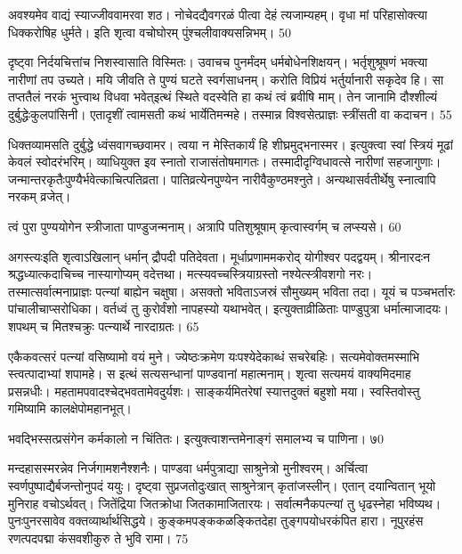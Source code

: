 अवश्यमेव वाद्यं स्याज्जीववामरवा शठ।
 नोचेदद्यैवगरळं पीत्वा देहं त्यजाम्यहम्।
 वृधा मां परिहासोक्त्या धिक्करोषिह धुर्मते।
 इति शृत्वा वचोघोरम् पुंश्चलीवाक्यसन्निभम्।
 50

  दृष्ट्वा निर्दयचित्तांच निशस्वासाति विस्मितः।
 उवाचच पुनर्मंदम् धर्मबोधेनशिक्षयन्।
 भर्तृशुश्रूषणं भक्त्या नारीणां तप उच्यते।
 मयि जीवति ते पुण्यं घटते स्वर्गसाधनम्।
 करोति विप्रियं भर्तुर्यानारी सकृदेव हि।
 सा तप्ततैलं नरकं भुत्त्वाथ विधवा भवेत्इत्थं स्थिते वदस्वेति हा कथं त्वं ब्रवीषि माम्।
 तेन जानामि दौश्शील्यं दुर्बुद्धेःकुलपांसिनी।
 एतादृशीं त्वामसती कथं भार्येतिमन्महे।
 तस्मान्न विश्वसेत्प्राज्ञः स्त्रींसती वा कदाचन।
 55

  धिक्तव्यामसति दुर्बुद्धे ध्वंसवागच्छवामर।
 त्वया न मेस्तिकार्यं हि शीघ्रमुद्भनास्मर।
 इत्युक्त्वा स्वां स्त्रियं मूढां केवलं स्वोदरंभरिम्।
 व्याधियुक्त इव स्नातो राजासंतोषमागतः।
 तस्मादीदृग्विधावत्से नारीणां सहजागुणाः।
 जन्मान्तरकृतैःपुण्यैर्भवेत्काचित्पतिव्रता।
 पातिव्रत्येनपुण्येन नारीवैकुण्ठमश्नुते।
 अन्यथासर्वतीर्थेषु स्नात्वापि नरकम् व्रजेत्।
 
त्वं पुरा पुण्ययोगेन स्त्रीजाता पाण्डुजन्मनाम्।
 अत्रापि पतिशुश्रूषाम् कृत्वास्वर्गम् च लप्स्यसे।
 60

  अगस्त्यःइति शृत्वाऽखिलान् धर्मान् द्रौपदी पतिदेवता।
 मूर्धाप्रणाममकरोद् योगीश्वर पदद्वयम्।
 श्रीनारदःन श्रद्धध्यात्कदाचिच्च नास्यागोप्यम् वदेत्तथा।
 मत्स्यवच्चस्त्रियाग्रस्तो नश्येत्स्त्रीवशगो नरः।
 तस्मात्सर्वात्मनाप्राज्ञः पत्न्यां बाह्येन चक्षुषा।
 असक्तो भविताऽजस्रं सौमुख्यम् भविता तदा।
 यूयं च पञ्चभर्तारः पांचालीचाप्सरोधिका।
 वर्तध्वं तु कुरोर्वंशो नापहस्यो यथाभवेत्।
 इत्युक्ताव्रीळिताः पाण्डुपुत्रा धर्मात्माजादयः।
 शपथम् च मितश्चक्रुः पत्न्यार्थे नारदाग्रतः।
 65

  एकैकवत्सरं पत्न्यां वसिष्यामो वयं मुने।
 ज्येष्ठःक्रमेण यःपश्येदेकाब्धं सचरेबहिः।
 सत्यमेवोक्तमस्माभि स्त्वत्पादाभ्यां शपामहे।
 स इत्थं सत्यसन्धानां पाण्डवानां महात्मनाम्।
 शृत्वा सत्यमयं वाक्यमिदमाह प्रसन्नधीः।
 महतामपवादश्चेद्भवतामेवदुर्यशः।
 साङ्कर्यमितरेषां स्यात्तदुक्तं बहुशो मया।
 स्वस्तिवोस्तु गमिष्यामि कालक्षेपोमहानभूत्।
 
भवद्भिस्सत्प्रसंगेन कर्मकालो न चिंतितः।
 इत्युक्त्वाशन्तमेनाङ्गं समालभ्य च पाणिना।
 ७0

  मन्दहासस्मरन्नेव निर्जगामशनैश्शनैः।
 पाण्डवा धर्मपुत्राद्या साश्रुनेत्रो मुनीश्वरम्।
 अर्चित्वा स्वर्णपुष्पाद्यैर्बजन्तोनुपदं ययुः।
 दृष्ट्वा सुप्रजतोदुःखात् साश्रुनेत्रान् कृतांजस्लीन्।
 एतान् दयान्वितान् भूयो मुनिराह वचोऽर्थवत्।
 जितेंद्रिया जितक्रोधा जितकामाजितारयः।
 सर्वात्मनैकपत्न्यां तु धृढस्नेहा भविष्यथ।
 पुनःपुनरसावेव वक्तव्यार्थार्थसिद्धये।
 कुङ्कमपङ्ककळङ्कितदेहा तुङ्गपयोधरकंपित हारा।
 नूपुरहंस रणत्पदपद्मा कंसवशीकुरु
ते भुवि रामा।
75

